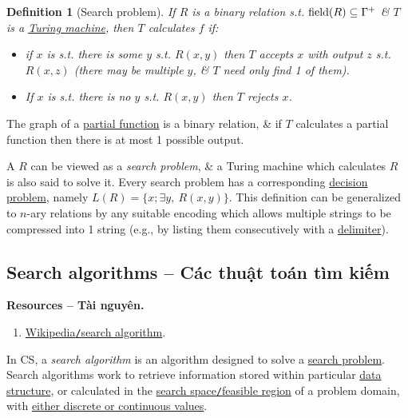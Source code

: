 \documentclass[oneside]{book}
\newtheorem{definition}{Definition}
\begin{document}
\begin{definition}[Search problem]
	If $R$ is a binary relation s.t. ${\rm field}(R)\subseteq\Gamma^+$ \& $T$ is a \href{https://en.wikipedia.org/wiki/Turing_machine}{Turing machine}, then $T$ calculates $f$ if:
	\begin{itemize}
		\item if $x$ is s.t. there is some $y$ s.t. $R(x,y)$ then $T$ accepts $x$ with output $z$ s.t. $R(x,z)$ (there may be multiple $y$, \& $T$ need only find 1 of them).
		\item If $x$ is s.t. there is no $y$ s.t. $R(x,y)$ then $T$ rejects $x$.
	\end{itemize}
\end{definition}
The graph of a \href{https://en.wikipedia.org/wiki/Partial_function}{partial function} is a binary relation, \& if $T$ calculates a partial function then there is at most 1 possible output.

A $R$ can be viewed as a {\it search problem}, \& a Turing machine which calculates $R$ is also said to solve it. Every search problem has a corresponding \href{https://en.wikipedia.org/wiki/Decision_problem}{decision problem}, namely $L(R) = \{x;\exists y,\ R(x,y)\}$. This definition can be generalized to $n$-ary relations by any suitable encoding which allows multiple strings to be compressed into 1 string (e.g., by listing them consecutively with a \href{https://en.wikipedia.org/wiki/Delimiter}{delimiter}).


\subsection{Search algorithms -- Các thuật toán tìm kiếm}
\textbf{\textsf{Resources -- Tài nguyên.}}
\begin{enumerate}
	\item \href{https://en.wikipedia.org/wiki/Search_algorithm}{Wikipedia{\tt/}search algorithm}.
\end{enumerate}
In CS, a {\it search algorithm} is an algorithm designed to solve a \href{https://en.wikipedia.org/wiki/Search_problem}{search problem}. Search algorithms work to retrieve information stored within particular \href{https://en.wikipedia.org/wiki/Data_structure}{data structure}, or calculated in the \href{https://en.wikipedia.org/wiki/Feasible_region}{search space{\tt/}feasible region} of a problem domain, with \href{https://en.wikipedia.org/wiki/Continuous_or_discrete_variable}{either discrete or continuous values}.
\end{document}
